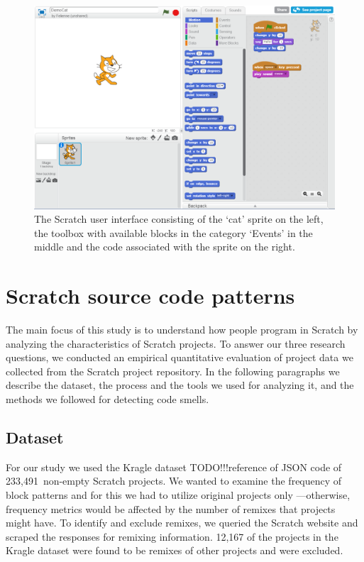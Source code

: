 \documentclass[preprint]{sigplanconf}
\newcommand{\nScriptPrograms}{233,491}
\newcommand{\todo}{TODO!!!}
\begin{document}
\begin{figure}
	\begin{center}
		\includegraphics[width=\columnwidth]{fig/ui.png}
		\vspace{-1em}
		\caption{The Scratch user interface consisting of the `cat' sprite on the left, the toolbox with available blocks in the category `Events' in the middle and the code associated with the sprite on the right.}
		\label{fig:ui}
	\end{center}
\end{figure} 

\section{Scratch source code patterns}
\label{sec:Patterns}

The main focus of this study is to understand how people program in Scratch by analyzing the characteristics of Scratch projects. To answer our three research questions, we conducted an empirical quantitative evaluation of project data we collected from the Scratch project repository. In the following paragraphs we describe the dataset, the process and the tools we used for analyzing it, and the methods we followed for detecting code smells.

\subsection{Dataset}
\label{dataset}

 For our study we used the Kragle dataset \todo{reference} of JSON code of \nScriptPrograms~non-empty Scratch projects. We wanted to examine the frequency of block patterns and for this we had to utilize original projects only ---otherwise, frequency metrics would be affected by the number of remixes that projects might have. To identify and exclude remixes, we queried the Scratch website and scraped the responses for remixing information. 12,167 of the projects in the Kragle dataset were found to be remixes of other projects and were excluded.
 
\end{document}
